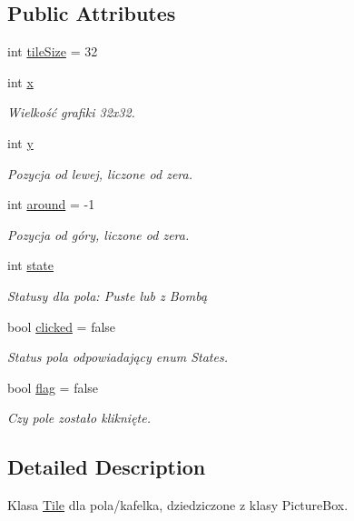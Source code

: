 \subsection*{Public Attributes}
\begin{DoxyCompactItemize}
\item 
int \mbox{\hyperlink{class_saper_1_1_tile_af14b4a73e2ea580fe25cf29eba901f83}{tile\+Size}} = 32
\item 
int \mbox{\hyperlink{class_saper_1_1_tile_a8861f08f0232b9e06b35f9539f97614e}{x}}
\begin{DoxyCompactList}\small\item\em Wielkość grafiki 32x32. \end{DoxyCompactList}\item 
int \mbox{\hyperlink{class_saper_1_1_tile_a4bee1eb877052349f14938b9d28eea87}{y}}
\begin{DoxyCompactList}\small\item\em Pozycja od lewej, liczone od zera. \end{DoxyCompactList}\item 
int \mbox{\hyperlink{class_saper_1_1_tile_a049847b44328392d75c1e04276417191}{around}} = -\/1
\begin{DoxyCompactList}\small\item\em Pozycja od góry, liczone od zera. \end{DoxyCompactList}\item 
int \mbox{\hyperlink{class_saper_1_1_tile_a59c61b4cd8fc0665533989c017b23688}{state}}
\begin{DoxyCompactList}\small\item\em Statusy dla pola\+: Puste lub z Bombą \end{DoxyCompactList}\item 
bool \mbox{\hyperlink{class_saper_1_1_tile_a0b3e70fcbb158d0d48856f4f1c21e74c}{clicked}} = false
\begin{DoxyCompactList}\small\item\em Status pola odpowiadający enum States. \end{DoxyCompactList}\item 
bool \mbox{\hyperlink{class_saper_1_1_tile_a558d8534615ae6ddcbdbef636b0b7d16}{flag}} = false
\begin{DoxyCompactList}\small\item\em Czy pole zostało kliknięte. \end{DoxyCompactList}\end{DoxyCompactItemize}


\subsection{Detailed Description}
Klasa \mbox{\hyperlink{class_saper_1_1_tile}{Tile}} dla pola/kafelka, dziedziczone z klasy Picture\+Box. 

